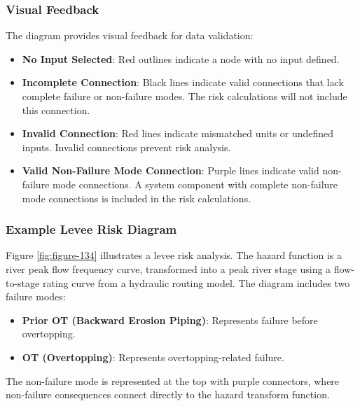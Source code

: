 \documentclass[
]{book}
\begin{document}
\hypertarget{visual-feedback}{%
\subsubsection*{Visual Feedback}\label{visual-feedback}}

The diagram provides visual feedback for data validation:

\begin{itemize}
\item
  \textbf{No Input Selected}: Red outlines indicate a node with no input defined.
\item
  \textbf{Incomplete Connection}: Black lines indicate valid connections that lack complete failure or non-failure modes. The risk calculations will not include this connection.
\item
  \textbf{Invalid Connection}: Red lines indicate mismatched units or undefined inputs. Invalid connections prevent risk analysis.
\item
  \textbf{Valid Non-Failure Mode Connection}: Purple lines indicate valid non-failure mode connections. A system component with complete non-failure mode connections is included in the risk calculations.
\end{itemize}

\hypertarget{example-levee-risk-diagram}{%
\subsubsection*{Example Levee Risk Diagram}\label{example-levee-risk-diagram}}

Figure \ref{fig:figure-134} illustrates a levee risk analysis. The hazard function is a river peak flow frequency curve, transformed into a peak river stage using a flow-to-stage rating curve from a hydraulic routing model. The diagram includes two failure modes:

\begin{itemize}
\item
  \textbf{Prior OT (Backward Erosion Piping)}: Represents failure before overtopping.
\item
  \textbf{OT (Overtopping)}: Represents overtopping-related failure.
\end{itemize}

The non-failure mode is represented at the top with purple connectors, where non-failure consequences connect directly to the hazard transform function.
\end{document}
